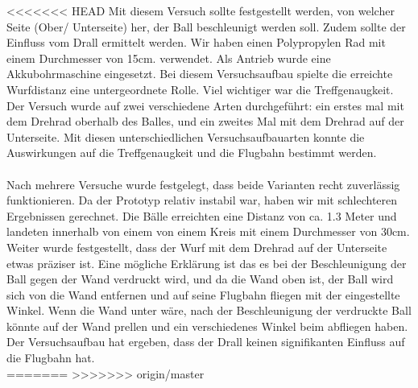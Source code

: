 <<<<<<< HEAD
Mit diesem Versuch sollte festgestellt werden, von welcher Seite (Ober/ Unterseite) her, der Ball beschleunigt werden soll. Zudem sollte der Einfluss vom Drall ermittelt werden. Wir haben einen Polypropylen Rad mit einem Durchmesser von 15cm. verwendet. Als Antrieb wurde eine Akkubohrmaschine eingesetzt. Bei diesem Versuchsaufbau spielte die erreichte Wurfdistanz eine untergeordnete Rolle. Viel wichtiger war die Treffgenaugkeit.  
Der Versuch wurde auf zwei verschiedene Arten durchgeführt: ein erstes mal mit dem Drehrad oberhalb des Balles, und ein zweites Mal mit dem Drehrad auf der Unterseite. Mit diesen unterschiedlichen Versuchsaufbauarten konnte die Auswirkungen auf die Treffgenaugkeit und die Flugbahn bestimmt werden.\\ \\
Nach mehrere Versuche wurde festgelegt, dass beide Varianten recht zuverlässig funktionieren. Da der Prototyp relativ instabil war, haben wir mit schlechteren Ergebnissen gerechnet. Die Bälle erreichten eine Distanz von ca. 1.3 Meter und landeten innerhalb von einem von einem Kreis mit einem Durchmesser von 30cm. 
\\Weiter wurde festgestellt, dass der Wurf mit dem Drehrad auf der Unterseite etwas präziser ist. Eine mögliche Erklärung ist das es bei der Beschleunigung der Ball gegen der Wand verdruckt wird, und da die Wand oben ist, der Ball wird sich von die Wand entfernen und auf seine Flugbahn fliegen mit der eingestellte Winkel. Wenn die Wand unter wäre, nach der Beschleunigung der verdruckte Ball könnte auf der Wand prellen und ein verschiedenes Winkel beim abfliegen haben. Der Versuchsaufbau hat ergeben, dass der Drall keinen signifikanten Einfluss auf die Flugbahn hat.\\
=======
>>>>>>> origin/master